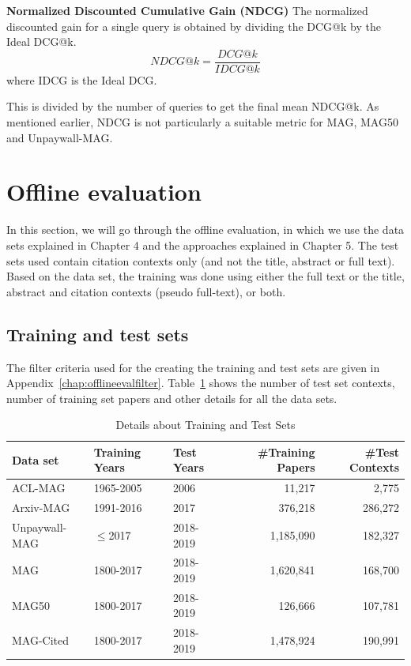 \textbf{Normalized Discounted Cumulative Gain (NDCG)}
The normalized discounted gain for a single query is obtained by dividing the DCG@k by the Ideal DCG@k. 
\begin{equation*}
    NDCG@k = \frac{DCG@k}{IDCG@k}
\end{equation*}
where IDCG is the Ideal DCG.

This is divided by the number of queries to get the final mean NDCG@k. 
As mentioned earlier, NDCG is not particularly a suitable metric for MAG, MAG50 and Unpaywall-MAG.
\section{Offline evaluation}
In this section, we will go through the offline evaluation, in which we use the data sets explained in Chapter 4 and the approaches explained in Chapter 5. The test sets used contain citation contexts only (and not the title, abstract or full text). Based on the data set, the training was done using either the full text or the title, abstract and citation contexts (pseudo full-text), or both. 

\subsection{Training and test sets}
The filter criteria used for the creating the training and test sets are given in Appendix~\ref{chap:offlineevalfilter}. Table~\ref{tab:trainingteststats} shows the number of test set contexts, number of training set papers and other details for all the data sets. 

\begin{table}[]
    \centering
    \begin{tabular}{lllrr}
    \toprule
       Data set  & Training Years & Test Years & \#Training Papers & \#Test Contexts \\
       \midrule
       ACL-MAG  & 1965-2005 & 2006 & 11,217 & 2,775 \\
       Arxiv-MAG  & 1991-2016 & 2017 & 376,218 & 286,272 \\
       Unpaywall-MAG  & $\le$2017 & 2018-2019 & 1,185,090 & 182,327 \\
       MAG  & 1800-2017 & 2018-2019 & 1,620,841 & 168,700 \\
       MAG50  & 1800-2017 & 2018-2019 & 126,666 & 107,781 \\
       MAG-Cited  & 1800-2017 & 2018-2019 & 1,478,924 & 190,991 \\
       \bottomrule
    \end{tabular}
    \caption{Details about Training and Test Sets}
    \label{tab:trainingteststats}
\end{table}

